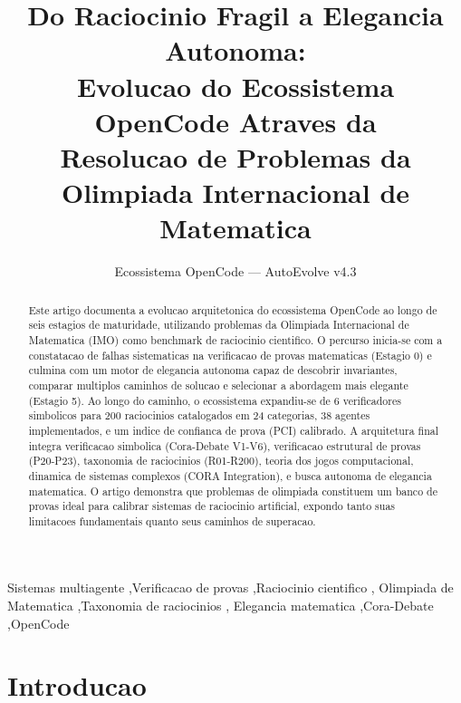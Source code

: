 \documentclass[5p]{elsarticle}
\begin{document}
\begin{frontmatter}
\title{\textbf{Do Raciocinio Fragil a Elegancia Autonoma:}\\
\large Evolucao do Ecossistema OpenCode Atraves da\\
Resolucao de Problemas da Olimpiada Internacional de Matematica}
\author[ufc]{Ecossistema OpenCode --- AutoEvolve v4.3}
\address[ufc]{Programa de Pos-Graduacao em Tecnologia da Informacao, Universidade Federal do Ceara, Fortaleza, CE, Brasil}

\begin{abstract}
Este artigo documenta a evolucao arquitetonica do ecossistema OpenCode ao longo de
seis estagios de maturidade, utilizando problemas da Olimpiada Internacional de
Matematica (IMO) como benchmark de raciocinio cientifico. O percurso inicia-se com
a constatacao de falhas sistematicas na verificacao de provas matematicas (Estagio 0)
e culmina com um motor de elegancia autonoma capaz de descobrir invariantes,
comparar multiplos caminhos de solucao e selecionar a abordagem mais elegante
(Estagio 5). Ao longo do caminho, o ecossistema expandiu-se de 6 verificadores
simbolicos para 200 raciocinios catalogados em 24 categorias, 38 agentes implementados,
e um indice de confianca de prova (PCI) calibrado. A arquitetura final integra
verificacao simbolica (Cora-Debate V1-V6), verificacao estrutural de provas (P20-P23),
taxonomia de raciocinios (R01-R200), teoria dos jogos computacional, dinamica de
sistemas complexos (CORA Integration), e busca autonoma de elegancia matematica.
O artigo demonstra que problemas de olimpiada constituem um banco de provas ideal
para calibrar sistemas de raciocinio artificial, expondo tanto suas limitacoes
fundamentais quanto seus caminhos de superacao.
\end{abstract}

\begin{keyword}
Sistemas multiagente \sep Verificacao de provas \sep Raciocinio cientifico \sep
Olimpiada de Matematica \sep Taxonomia de raciocinios \sep
Elegancia matematica \sep Cora-Debate \sep OpenCode
\end{keyword}
\end{frontmatter}

\tableofcontents
\newpage

\tableofcontents
\newpage

\section{Introducao}
\end{document}
